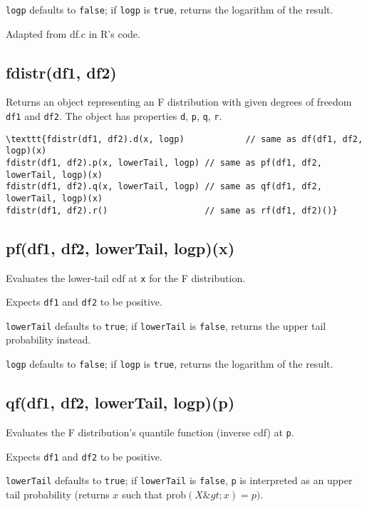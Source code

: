 \documentclass{article}
\begin{document}
\texttt{logp} defaults to \texttt{false}; if \texttt{logp} is \texttt{true}, returns the
logarithm of the result.


Adapted from df.c in R's code.


    \subsection*{fdistr(df1, df2)}
    Returns an object representing an F distribution with
given degrees of freedom \texttt{df1} and \texttt{df2}.  The object has
properties \texttt{d}, \texttt{p}, \texttt{q}, \texttt{r}.


\begin{lstlisting}
\texttt{fdistr(df1, df2).d(x, logp)            // same as df(df1, df2, logp)(x)
fdistr(df1, df2).p(x, lowerTail, logp) // same as pf(df1, df2, lowerTail, logp)(x)
fdistr(df1, df2).q(x, lowerTail, logp) // same as qf(df1, df2, lowerTail, logp)(x)
fdistr(df1, df2).r()                   // same as rf(df1, df2)()}\end{lstlisting}

    \subsection*{pf(df1, df2, lowerTail, logp)(x)}
    Evaluates the lower-tail cdf at \texttt{x} for the F distribution.


Expects \texttt{df1} and \texttt{df2} to be positive.


\texttt{lowerTail} defaults to \texttt{true}; if \texttt{lowerTail} is \texttt{false}, returns
the upper tail probability instead.


\texttt{logp} defaults to \texttt{false}; if \texttt{logp} is \texttt{true}, returns the logarithm
of the result.


    \subsection*{qf(df1, df2, lowerTail, logp)(p)}
    Evaluates the F distribution's quantile function
(inverse cdf) at \texttt{p}.


Expects \texttt{df1} and \texttt{df2} to be positive.


\texttt{lowerTail} defaults to \texttt{true}; if \texttt{lowerTail} is \texttt{false}, \texttt{p} is
interpreted as an upper tail probability (returns
$x$ such that $\textrm{prob}(X \&gt; x) = p)$.
\end{document}
